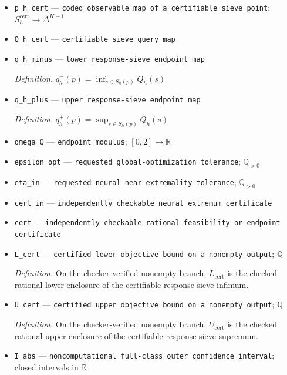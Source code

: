 \documentclass{article}
\begin{document}
\begin{itemize}
  \item \texttt{p\_\allowbreak{}h\_\allowbreak{}cert} --- \texttt{coded observable map of a certifiable sieve point}; \(S_h^{\mathrm{cert}}\to\Delta^{K-1}\)
  \item \texttt{Q\_\allowbreak{}h\_\allowbreak{}cert} --- \texttt{certifiable sieve query map}
  \item \texttt{q\_\allowbreak{}h\_\allowbreak{}minus} --- \texttt{lower response-\allowbreak{}sieve endpoint map}
  \par\smallskip\noindent\emph{Definition.} \(q_h^-(p)=\inf_{s\in S_h(p)}Q_h(s)\)
  \item \texttt{q\_\allowbreak{}h\_\allowbreak{}plus} --- \texttt{upper response-\allowbreak{}sieve endpoint map}
  \par\smallskip\noindent\emph{Definition.} \(q_h^+(p)=\sup_{s\in S_h(p)}Q_h(s)\)
  \item \texttt{omega\_\allowbreak{}Q} --- \texttt{endpoint modulus}; \([0,2]\to\mathbb R_+\)
  \item \texttt{epsilon\_\allowbreak{}opt} --- \texttt{requested global-\allowbreak{}optimization tolerance}; \(\mathbb Q_{>0}\)
  \item \texttt{eta\_\allowbreak{}in} --- \texttt{requested neural near-\allowbreak{}extremality tolerance}; \(\mathbb Q_{>0}\)
  \item \texttt{cert\_\allowbreak{}in} --- \texttt{independently checkable neural extremum certificate}
  \item \texttt{cert} --- \texttt{independently checkable rational feasibility-\allowbreak{}or-\allowbreak{}endpoint certificate}
  \item \texttt{L\_\allowbreak{}cert} --- \texttt{certified lower objective bound on a nonempty output}; \(\mathbb Q\)
  \par\smallskip\noindent\emph{Definition.} On the checker-verified nonempty branch, \(L_{\mathrm{cert}}\) is the checked rational lower enclosure of the certifiable response-sieve infimum.
  \item \texttt{U\_\allowbreak{}cert} --- \texttt{certified upper objective bound on a nonempty output}; \(\mathbb Q\)
  \par\smallskip\noindent\emph{Definition.} On the checker-verified nonempty branch, \(U_{\mathrm{cert}}\) is the checked rational upper enclosure of the certifiable response-sieve supremum.
  \item \texttt{I\_\allowbreak{}abs} --- \texttt{noncomputational full-\allowbreak{}class outer confidence interval}; closed intervals in \(\mathbb R\)

\end{itemize}
\end{document}
